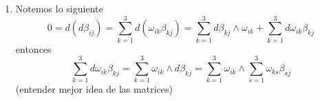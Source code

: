 \documentclass{article}
\begin{document}
\begin{enumerate}
    \item Notemos lo siguiente
    \begin{equation*}
        0=d(d\beta_{ij})=\sum_{k=1}^{3}d(\omega_{ik}\beta_{kj})
        =\sum_{k=1}^{3}d\beta_{kj}\land\omega_{ik}+\sum_{k=1}^{3}d\omega_{ik}\beta_{kj}
    \end{equation*}
    entonces
    \begin{equation*}
        \sum_{k=1}^{3}d\omega_{ik}\beta_{kj}=\sum_{k=1}^{3}\omega_{ik}\land d\beta_{kj}
        =\sum_{k=1}^{3}\omega_{ik}\land\sum_{s=1}^{3}\omega_{ks}\beta_{sj}
    \end{equation*}
    (entender mejor idea de las matrices)
\end{enumerate}

\end{document}
